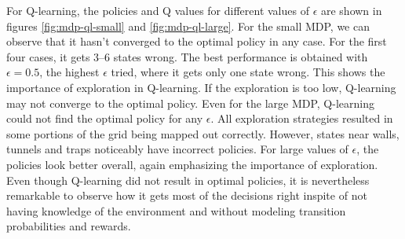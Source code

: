 \documentclass[letterpaper]{article}
\begin{document}
	For Q-learning, the policies and Q values for different values of $\epsilon$ are shown in figures \ref{fig:mdp-ql-small} and \ref{fig:mdp-ql-large}. For the small MDP, we can observe that it hasn't converged to the optimal policy in any case. For the first four cases, it gets 3--6 states wrong. The best performance is obtained with $\epsilon = 0.5$, the highest $\epsilon$ tried, where it gets only one state wrong. This shows the importance of exploration in Q-learning. If the exploration is too low, Q-learning may not converge to the optimal policy. Even for the large MDP, Q-learning could not find the optimal policy for any $\epsilon$. All exploration strategies resulted in some portions of the grid being mapped out correctly. However, states near walls, tunnels and traps noticeably have incorrect policies. For large values of $\epsilon$, the policies look better overall, again emphasizing the importance of exploration. Even though Q-learning did not result in optimal policies, it is nevertheless remarkable to observe how it gets most of the decisions right inspite of not having knowledge of the environment and without modeling transition probabilities and rewards.
	
\end{document}
